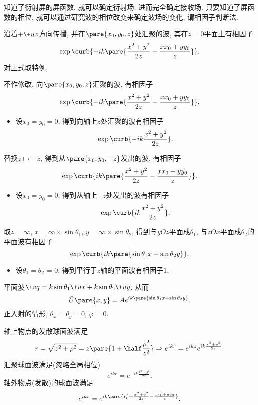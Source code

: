 \documentclass{ctexart}
\begin{document}
知道了衍射屏的屏函数, 就可以确定衍射场, 进而完全确定接收场. 只要知道了屏函数的相位, 就可以通过研究波的相位改变来确定波场的变化, 谓相因子判断法.
\par
沿着$+\+uz$方向传播, 并在$\pare{x_0, y_0, z}$处汇聚的波, 其在$z=0$平面上有相因子
\[ \exp\curb{-ik\pare{\frac{x^2+y^2}{2z} - \frac{xx_0+yy_0}{z}}}. \]
对上式取特例,
\begin{cenum}
    \item 不作修改, 向$\pare{x_0, y_0, z}$汇聚的波, 有相因子
    \[ \exp\curb{-ik\pare{\frac{x^2+y^2}{2z} - \frac{xx_0+yy_0}{z}}}. \]
    \begin{itemize}
        \item 设$x_0 = y_0 = 0$, 得到向轴上$z$处汇聚的波有相因子
        \[ \exp\curb{-ik \frac{x^2+y^2}{2z}}. \]
    \end{itemize}
    \item 替换$z\mapsto -z$, 得到从$\pare{x_0, y_0, -z}$发出的波, 有相因子
    \[ \exp\curb{ik\pare{\frac{x^2+y^2}{2z} - \frac{xx_0 + yy_0}{z}}}. \]
    \begin{itemize}
        \item 设$x_0 = y_0 = 0$, 得到从轴上$-z$处发出的波有相因子
        \[ \exp\curb{ik \frac{x^2+y^2}{2z}}. \]
    \end{itemize}
    \item 取$z=\infty$, $x = \infty \times \sin \theta_1$, $y = \infty\times \sin\theta_2$, 得到与$yOz$平面成$\theta_1$, 与$zOx$平面成$\theta_2$的平面波有相因子
    \[ \exp\curb{ik\pare{\sin\theta_1 x + \sin\theta_2 y}}. \]
    \begin{itemize}
        \item 设$\theta_1 = \theta_2$ = 0, 得到平行于$z$轴的平面波有相因子$1$.
    \end{itemize}
\end{cenum}
\begin{sample}
    \begin{ex}
        平面波$\+vq = k\sin\theta_1\+ux + k\sin\theta_2\+uy$, 从而
        \[ \tilde{U}\pare{x,y} = Ae^{ik\pare{\sin\theta_1 x + \sin\theta_2 y}}. \]
        正入射的情形, $\theta_x = \theta_y = 0$, $\varphi = 0$.
        \par
        轴上物点的发散球面波满足
        \[ r = \sqrt{z^2 + \rho^2} = z\pare{1+\half \frac{\rho^2}{z^2}}\Rightarrow e^{ikr} = e^{ikz}e^{ik \frac{x^2+y^2}{2z}}. \]
        汇聚球面波满足(忽略全局相位)
        \[ e^{ikr} = e^{-ik \frac{x^2+y^2}{2z}}. \]
        轴外物点(发散)的球面波满足
        \[ e^{ikr} = e^{ik\pare{r_0' + \frac{x^2+y^2}{2z} - \frac{xx_0+yy_0}{z}}}. \]
    \end{ex}
\end{sample}
\end{document}
